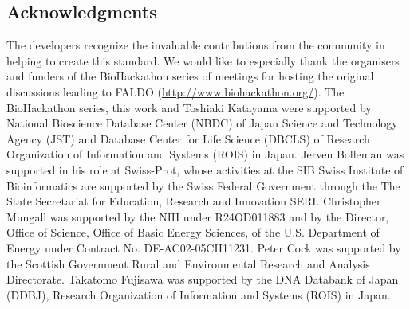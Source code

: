\documentclass[10pt]{bmc_article}
\newenvironment{bmcformat}{\begin{raggedright}\baselineskip20pt\sloppy\setboolean{publ}{false}}{\end{raggedright}\baselineskip20pt\sloppy}
\begin{document}
\begin{bmcformat}
\section*{Acknowledgments}
The developers recognize the invaluable contributions from the community in helping to create this standard.
We would like to especially thank the organisers and funders of the BioHackathon series of meetings for hosting the original discussions leading to FALDO (\url{http://www.biohackathon.org/}). 
The BioHackathon series, this work and Toshiaki Katayama were supported by National Bioscience Database Center (NBDC) of Japan Science and Technology Agency (JST) and Database Center for Life Science (DBCLS) of Research Organization of Information and Systems (ROIS) in Japan.
Jerven Bolleman was supported in his role at Swiss-Prot, whose activities at the SIB Swiss Institute of Bioinformatics are supported by the Swiss Federal Government through the The State Secretariat for Education, Research and Innovation SERI.
Christopher Mungall was supported by the NIH under R24OD011883 and by the Director, Office of Science, Office of Basic Energy Sciences, of the U.S. Department of Energy under Contract No. DE-AC02-05CH11231.
Peter Cock was supported by the Scottish Government Rural and Environmental Research and Analysis Directorate.
Takatomo Fujisawa was supported by the DNA Databank of Japan (DDBJ), Research Organization of Information and Systems (ROIS) in Japan.

\newpage
{
   }     %
  
\end{bmcformat}
\end{document}
